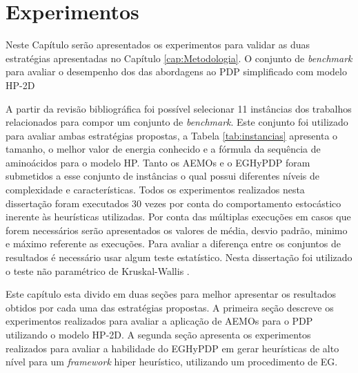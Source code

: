 \chapter{Experimentos}
\label{cap:experimentos}

Neste Capítulo serão apresentados  os experimentos para  validar as duas estratégias apresentadas no Capítulo \ref{cap:Metodologia}. 
O conjunto de \textit{benchmark} para avaliar o desempenho dos das abordagens ao PDP simplificado com modelo HP-2D


A partir da revisão bibliográfica foi possível selecionar 11 instâncias dos trabalhos relacionados \cite{unger1993genetic,krasnogor2002multimeme,shmygelska2002ant,shmygelska2003improved,hsu2003growth} para compor um conjunto de \textit{benchmark}. Este conjunto foi utilizado para avaliar ambas estratégias propostas, a Tabela \ref{tab:instancias} apresenta o tamanho, o melhor valor de energia conhecido e a fórmula da sequência de aminoácidos para o modelo HP. Tanto os AEMOs e o EGHyPDP foram submetidos a esse conjunto de instâncias o qual possui diferentes níveis de complexidade e características. Todos os experimentos realizados nesta dissertação foram executados 30 vezes por conta do comportamento estocástico inerente às heurísticas utilizadas. Por conta das múltiplas execuções em casos que forem necessários serão apresentados os valores de média, desvio padrão, minimo e máximo referente as execuções. Para avaliar a diferença entre os conjuntos de resultados é necessário usar algum teste estatístico. Nesta dissertação foi utilizado o teste não paramétrico de  Kruskal-Wallis \cite{mckight2010kruskal}.



Este capítulo esta divido em duas seções para melhor apresentar os resultados obtidos por cada uma das estratégias propostas. A primeira seção descreve os experimentos realizados para avaliar a aplicação de AEMOs para o PDP utilizando o modelo HP-2D. A segunda seção apresenta os experimentos realizados para avaliar a habilidade do EGHyPDP em gerar heurísticas de alto nível para um \textit{framework} hiper heurístico, utilizando um procedimento de EG.




